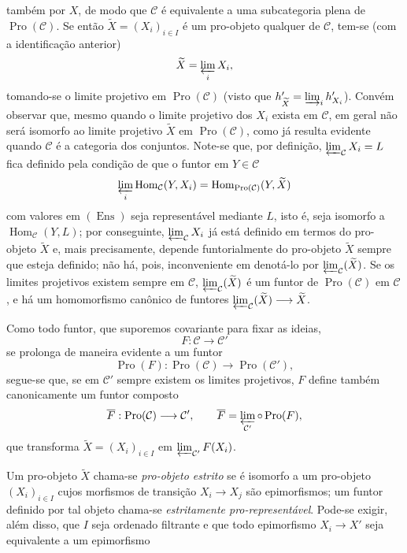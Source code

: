 \documentclass[11pt,twoside,openany]{book}
\numberwithin{equation}{section}
\newcommand{\src}[1]{%
  \phantomsection\hypertarget{src:#1}{}%
  \marginpar{\raggedleft\footnotesize\sffamily #1}%
}
\theoremstyle{plain}
\theoremstyle{definition}
\theoremstyle{remark}
\newcommand{\FgaUnitKey}{frontmatter}
\renewcommand{\src}[1]{%
  \phantomsection\hypertarget{src:\FgaUnitKey:#1}{}%
  \marginpar{\raggedleft\footnotesize\sffamily #1}%
}
\begin{document}
\src{372}
também por $X$, de modo que $\mathcal C$ é equivalente a uma subcategoria
plena de $\operatorname{Pro}(\mathcal C)$. Se então
$\widetilde X=(X_i)_{i\in I}$ é um pro-objeto qualquer de $\mathcal C$, tem-se
(com a identificação anterior)
\[
  \widetilde X=\varprojlim_i X_i,
\]
tomando-se o limite projetivo em $\operatorname{Pro}(\mathcal C)$
(visto que $h'_{\widetilde X}=\varinjlim_i h'_{X_i}$). Convém observar que,
mesmo quando o limite projetivo dos $X_i$ exista em $\mathcal C$, em
geral não será isomorfo ao limite projetivo $\widetilde X$ em
$\operatorname{Pro}(\mathcal C)$, como já resulta evidente quando $\mathcal C$
é a categoria dos conjuntos. Note-se que, por definição,
$\varprojlim_{\mathcal C}X_i=L$ fica definido pela condição de que o
funtor em $Y\in\mathcal C$
\[
  \varprojlim_i\operatorname{Hom}_{\mathcal C}(Y,X_i)
  =\operatorname{Hom}_{\operatorname{Pro}(\mathcal C)}(Y,\widetilde X)
\]
com valores em $(\operatorname{Ens})$ seja representável mediante $L$, isto é,
seja isomorfo a $\operatorname{Hom}_{\mathcal C}(Y,L)$; por conseguinte,
$\varprojlim_{\mathcal C}X_i$ já está definido em termos do pro-objeto
$\widetilde X$ e, mais precisamente, depende funtorialmente do pro-objeto
$\widetilde X$ sempre que esteja definido; não há, pois, inconveniente em
denotá-lo por $\varprojlim_{\mathcal C}(\widetilde X)$. Se os limites
projetivos existem sempre em $\mathcal C$,
$\varprojlim_{\mathcal C}(\widetilde X)$ é um funtor de
$\operatorname{Pro}(\mathcal C)$ em $\mathcal C$, e há um homomorfismo
canônico de funtores
$\varprojlim_{\mathcal C}(\widetilde X)\longrightarrow\widetilde X$.

Como todo funtor, que suporemos covariante para fixar as ideias,
\[
  F:\mathcal C\longrightarrow\mathcal C'
\]
se prolonga de maneira evidente a um funtor
\[
  \operatorname{Pro}(F):\operatorname{Pro}(\mathcal C)
  \longrightarrow\operatorname{Pro}(\mathcal C'),
\]
segue-se que, se em $\mathcal C'$ sempre existem os limites projetivos, $F$
define também canonicamente um funtor composto
\[
  \overline F:\operatorname{Pro}(\mathcal C)\longrightarrow\mathcal C',
  \qquad
  \overline F=\varprojlim_{\mathcal C'}\circ\operatorname{Pro}(F),
\]
que transforma $\widetilde X=(X_i)_{i\in I}$ em
$\varprojlim_{\mathcal C'}F(X_i)$.

Um pro-objeto $\widetilde X$ chama-se \emph{pro-objeto estrito} se é isomorfo a
um pro-objeto $(X_i)_{i\in I}$ cujos morfismos de transição
$X_i\longrightarrow X_j$ são epimorfismos; um funtor definido por tal objeto
chama-se \emph{estritamente pro-representável}. Pode-se exigir, além disso, que $I$
seja ordenado filtrante e que todo epimorfismo $X_i\longrightarrow X'$ seja
equivalente a um epimorfismo
\end{document}
